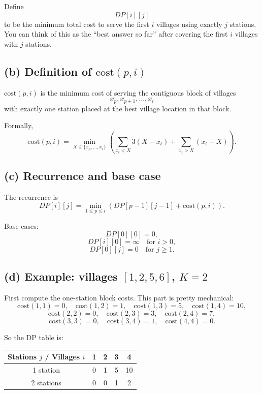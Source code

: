 \documentclass[12pt]{article}
\begin{document}
Define
\[
DP[i][j]
\]
to be the minimum total cost to serve the first \(i\) villages using exactly \(j\) stations.
You can think of this as the ``best answer so far'' after covering the first \(i\) villages with \(j\) stations.

\subsection*{(b) Definition of \(\mathrm{cost}(p,i)\)}

\(\mathrm{cost}(p,i)\) is the minimum cost of serving the contiguous block of villages
\[
x_p, x_{p+1}, \dots, x_i
\]
with exactly one station placed at the best village location in that block.

Formally,
\[
\mathrm{cost}(p,i)
=
\min_{X \in \{x_p,\dots,x_i\}}
\left(
\sum_{x_t<X} 3(X-x_t) + \sum_{x_t>X} (x_t-X)
\right).
\]

\subsection*{(c) Recurrence and base case}

The recurrence is
\[
DP[i][j] = \min_{1 \le p \le i} \left( DP[p-1][j-1] + \mathrm{cost}(p,i) \right).
\]

Base cases:
\[
DP[0][0]=0,
\]
\[
DP[i][0]=\infty \quad \text{for } i>0,
\]
\[
DP[0][j]=0 \quad \text{for } j\ge 1.
\]

\subsection*{(d) Example: villages \([1,2,5,6]\), \(K=2\)}

First compute the one-station block costs. This part is pretty mechanical:
\[
\mathrm{cost}(1,1)=0,\quad
\mathrm{cost}(1,2)=1,\quad
\mathrm{cost}(1,3)=5,\quad
\mathrm{cost}(1,4)=10,
\]
\[
\mathrm{cost}(2,2)=0,\quad
\mathrm{cost}(2,3)=3,\quad
\mathrm{cost}(2,4)=7,
\]
\[
\mathrm{cost}(3,3)=0,\quad
\mathrm{cost}(3,4)=1,\quad
\mathrm{cost}(4,4)=0.
\]

So the DP table is:

\begin{center}
\begin{tabular}{@{}ccccc@{}}
\toprule
Stations \(j\) / Villages \(i\) & 1 & 2 & 3 & 4 \\
\midrule
1 station  & 0 & 1 & 5 & 10 \\
2 stations & 0 & 0 & 1 & 2 \\
\bottomrule
\end{tabular}
\end{center}
\end{document}
